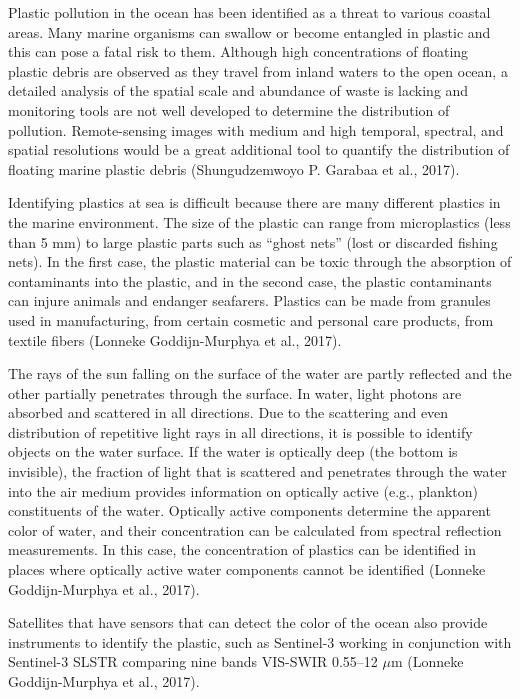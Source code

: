 \begin{example}
	\label{exa:plastic}
	Plastic pollution in the ocean has been identified as a threat to various coastal areas. Many marine organisms can swallow or become entangled in plastic and this can pose a fatal risk to them. Although high concentrations of floating plastic debris are observed as they travel from inland waters to the open ocean, a detailed analysis of the spatial scale and abundance of waste is lacking and monitoring tools are not well developed to determine the distribution of pollution. Remote-sensing images with medium and high temporal, spectral, and spatial resolutions would be a great additional tool to quantify the distribution of floating marine plastic debris (Shungudzemwoyo P. Garabaa et al., 2017).
	
	Identifying plastics at sea is difficult because there are many different plastics in the marine environment. The size of the plastic can range from microplastics (less than 5 mm) to large plastic parts such as “ghost nets” (lost or discarded fishing nets). In the first case, the plastic material can be toxic through the absorption of contaminants into the plastic, and in the second case, the plastic contaminants can injure animals and endanger seafarers. Plastics can be made from granules used in manufacturing, from certain cosmetic and personal care products, from textile fibers (Lonneke Goddijn-Murphya et al., 2017).
	
	The rays of the sun falling on the surface of the water are partly reflected and the other partially penetrates through the surface. In water, light photons are absorbed and scattered in all directions. Due to the scattering and even distribution of repetitive light rays in all directions, it is possible to identify objects on the water surface. If the water is optically deep (the bottom is invisible), the fraction of light that is scattered and penetrates through the water into the air medium provides information on optically active (e.g., plankton) constituents of the water. Optically active components determine the apparent color of water, and their concentration can be calculated from spectral reflection measurements. In this case, the concentration of plastics can be identified in places where optically active water components cannot be identified (Lonneke Goddijn-Murphya et al., 2017).
	
	Satellites that have sensors that can detect the color of the ocean also provide instruments to identify the plastic, such as Sentinel-3 working in conjunction with Sentinel-3 SLSTR comparing nine bands VIS-SWIR 0.55–12 {$\mu$}m (Lonneke Goddijn-Murphya et al., 2017).
\end{example}

